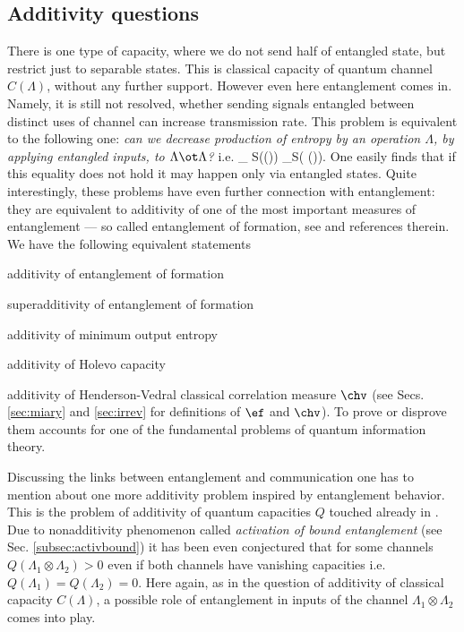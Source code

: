 \documentclass[rmp,12pt,preprint]{revtex4-2}
\begin{document}
\subsection{Additivity questions}
There is one type of capacity, where we do not send half of
entangled state, but restrict just to separable states. This is
classical capacity of quantum channel $C(\Lambda)$, without any
further support. However even here entanglement comes in. Namely, it
is still not resolved, whether sending signals entangled between
distinct uses of channel can increase transmission rate. This
problem is equivalent to the following one: {\it can we decrease
production of entropy by an operation $\Lambda$, by applying
entangled inputs, to $\Lambda \ot \Lambda$?} i.e.
 \inf_\rho
S(\Lambda(\rho))  \inf_\rho S(\Lambda\ot
\Lambda(\rho)). \ee
One easily finds that if this  equality does not hold
it may happen only via entangled states. Quite
interestingly, these problems have even further connection with
entanglement: they are equivalent to additivity of one of the most
important measures of entanglement --- so called entanglement of
formation, see \cite{ShorAdditivity,AudenaertB2004,Matsumoto2005,KoashiW-monogamy} and references therein. We have
the following equivalent statements
\bei
\item additivity of entanglement of formation
\item superadditivity of entanglement of formation
\item additivity of minimum output entropy
\item additivity of Holevo capacity
\item additivity of Henderson-Vedral classical correlation measure  $\chv$
\eei
(see Secs. \ref{sec:miary} and \ref{sec:irrev} for definitions of $\ef$ and $\chv$).
To prove or disprove them  accounts  for one of
the fundamental problems of quantum information theory.


Discussing the links between entanglement and communication one has
to  mention about one more additivity problem inspired by
entanglement behavior. This is the problem of additivity of quantum
capacities $Q$ touched already in \cite{BDSW1996}.
Due to nonadditivity phenomenon called {\it activation of bound
entanglement} (see Sec. \ref{subsec:activbound}) it
has been even conjectured \cite{activation} that for some channels
$Q(\Lambda_{1} \otimes \Lambda_{2})>0$ even if both channels have
vanishing capacities i.e. $Q(\Lambda_{1})=Q(\Lambda_{2})=0$.
Here again, as in the question of additivity of classical capacity
$C(\Lambda)$, a possible role of entanglement in inputs of the
channel $\Lambda_{1} \otimes \Lambda_{2}$ comes into play.
\end{document}
